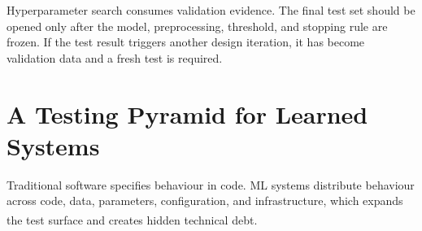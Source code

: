 Hyperparameter search consumes validation evidence.
The final test set should be opened only after the model, preprocessing,
threshold, and stopping rule are frozen.
If the test result triggers another design iteration, it has become validation
data and a fresh test is required.

\section{A Testing Pyramid for Learned Systems}

Traditional software specifies behaviour in code.
ML systems distribute behaviour across code, data, parameters, configuration,
and infrastructure, which expands the test surface and creates hidden
technical debt.\textsuperscript{\cite{sculleyHiddenTechnicalDebt2015}}

\begin{center}
\label{fig:ml-testing-pyramid}
\end{center}

